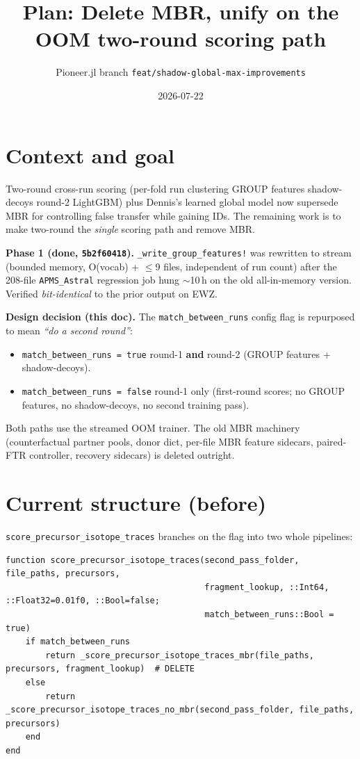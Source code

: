 \documentclass[10pt]{article}
\title{\vspace{-1.5em}\textbf{Plan: Delete MBR, unify on the OOM two-round scoring path}}
\author{Pioneer.jl \textemdash{} branch \texttt{feat/shadow-global-max-improvements}}
\date{2026-07-22}
\begin{document}
\maketitle
\vspace{-1.5em}

\section{Context and goal}

Two-round cross-run scoring (per-fold run clustering \textrightarrow{} GROUP features \textrightarrow{}
shadow-decoys \textrightarrow{} round-2 LightGBM) plus Dennis's learned global model now supersede MBR
for controlling false transfer while gaining IDs. The remaining work is to make two-round the
\emph{single} scoring path and remove MBR.

\textbf{Phase 1 (done, \texttt{5b2f60418}).} \verb|_write_group_features!| was rewritten to stream
(bounded memory, O(vocab) + $\leq$9 files, independent of run count) after the 208-file
\texttt{APMS\_Astral} regression job hung $\sim$10\,h on the old all-in-memory version. Verified
\emph{bit-identical} to the prior output on EWZ.

\textbf{Design decision (this doc).} The \texttt{match\_between\_runs} config flag is repurposed to mean
\emph{``do a second round''}:
\begin{itemize}[nosep,leftmargin=1.4em]
  \item \texttt{match\_between\_runs = true} \textrightarrow{} round-1 \textbf{and} round-2 (GROUP
        features + shadow-decoys).
  \item \texttt{match\_between\_runs = false} \textrightarrow{} round-1 only (first-round scores; no
        GROUP features, no shadow-decoys, no second training pass).
\end{itemize}
Both paths use the streamed OOM trainer. The old MBR machinery (counterfactual partner pools, donor
dict, per-file MBR feature sidecars, paired-FTR controller, recovery sidecars) is deleted outright.

\section{Current structure (before)}

\texttt{score\_precursor\_isotope\_traces} branches on the flag into two whole pipelines:

\begin{lstlisting}
function score_precursor_isotope_traces(second_pass_folder, file_paths, precursors,
                                        fragment_lookup, ::Int64, ::Float32=0.01f0, ::Bool=false;
                                        match_between_runs::Bool = true)
    if match_between_runs
        return _score_precursor_isotope_traces_mbr(file_paths, precursors, fragment_lookup)  # DELETE
    else
        return _score_precursor_isotope_traces_no_mbr(second_pass_folder, file_paths, precursors)
    end
end
\end{lstlisting}
\end{document}
